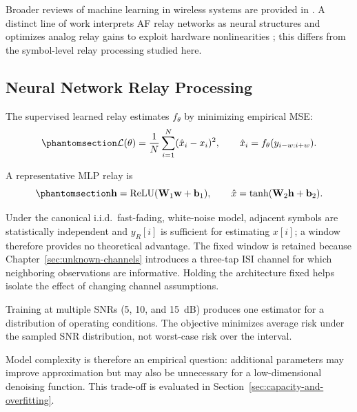 Broader reviews of machine learning in wireless systems are provided in \cite{Gunduz2019MLAir}. A distinct line of work interprets AF relay networks as neural structures and optimizes analog relay gains to exploit hardware nonlinearities \cite{Bergel2023RelaysAsNeurons,BergelICASSP2024}; this differs from the symbol-level relay processing studied here.

\subsection{Neural Network Relay Processing}\label{sec:neural-network-relay-processing}

The supervised learned relay estimates \(f_\theta\) by minimizing empirical MSE:
\begin{equation}\protect\phantomsection\label{eq:mse-loss}
\mathcal{L}(\theta)
=
\frac{1}{N}\sum_{i=1}^{N}(\hat{x}_i-x_i)^2,
\qquad
\hat{x}_i=f_\theta(y_{i-w:i+w}).
\end{equation}

A representative MLP relay is
\begin{equation}\protect\phantomsection\label{eq:mlp-relay}
\mathbf{h}
=
\text{ReLU}(\mathbf{W}_1\mathbf{w}+\mathbf{b}_1),
\qquad
\hat{x}
=
\tanh(\mathbf{W}_2\mathbf{h}+\mathbf{b}_2).
\end{equation}

Under the canonical i.i.d.\ fast-fading, white-noise model, adjacent symbols are statistically independent and \(y_R[i]\) is sufficient for estimating \(x[i]\); a window therefore provides no theoretical advantage. The fixed window is retained because Chapter~\ref{sec:unknown-channels} introduces a three-tap ISI channel for which neighboring observations are informative. Holding the architecture fixed helps isolate the effect of changing channel assumptions.

Training at multiple SNRs (5, 10, and 15~dB) produces one estimator for a distribution of operating conditions. The objective minimizes average risk under the sampled SNR distribution, not worst-case risk over the interval.

Model complexity is therefore an empirical question: additional parameters may improve approximation but may also be unnecessary for a low-dimensional denoising function. This trade-off is evaluated in Section~\ref{sec:capacity-and-overfitting}.

